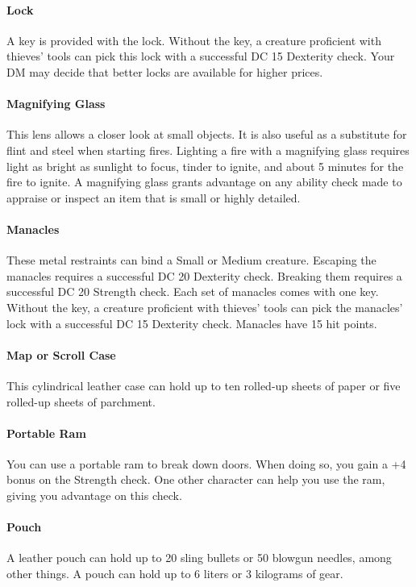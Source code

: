     \paragraph{Lock}
        A key is provided with the lock.
        Without the key, a creature proficient with thieves' tools can pick this lock with a successful DC 15 Dexterity check.
        Your DM may decide that better locks are available for higher prices.
    \paragraph{Magnifying Glass}
        This lens allows a closer look at small objects.
        It is also useful as a substitute for flint and steel when starting fires.
        Lighting a fire with a magnifying glass requires light as bright as sunlight to focus, tinder to ignite, and about 5 minutes for the fire to ignite.
        A magnifying glass grants advantage on any ability check made to appraise or inspect an item that is small or highly detailed.
    \paragraph{Manacles}
        These metal restraints can bind a Small or Medium creature.
        Escaping the manacles requires a successful DC 20 Dexterity check.
        Breaking them requires a successful DC 20 Strength check.
        Each set of manacles comes with one key.
        Without the key, a creature proficient with thieves' tools can pick the manacles' lock with a successful DC 15 Dexterity check.
        Manacles have 15 hit points.
    \paragraph{Map or Scroll Case}
        This cylindrical leather case can hold up to ten rolled-up sheets of paper or five rolled-up sheets of parchment.
    \paragraph{Portable Ram}
        You can use a portable ram to break down doors.
        When doing so, you gain a +4 bonus on the Strength check.
        One other character can help you use the ram, giving you advantage on this check.
    \paragraph{Pouch}
        A leather pouch can hold up to 20 sling bullets or 50 blowgun needles, among other things.
        A pouch can hold up to 6 liters or 3 kilograms of gear.
